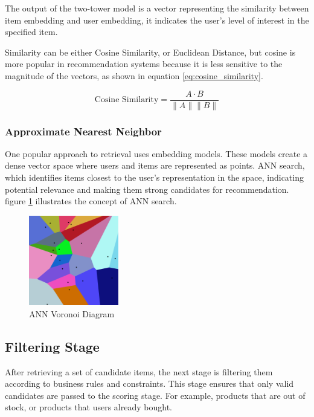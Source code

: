 The output of the two-tower model is a vector representing the similarity between item embedding and user embedding, 
it indicates the user's level of interest in the specified item.

Similarity can be either Cosine Similarity, or Euclidean Distance, but cosine is more popular in recommendation systems because it is less sensitive to the magnitude of the vectors, as shown in equation \ref{eq:cosine_similarity}.

\begin{equation}
    \text{Cosine Similarity} = \frac{A \cdot B}{\|A\| \|B\|}
    \label{eq:cosine_similarity}
\end{equation}


\subsubsection{Approximate Nearest Neighbor}

One popular approach to retrieval uses embedding models. 
These models create a dense vector space where users and items are represented as points.
ANN search,
which identifies items closest to the user's representation in the space, 
indicating potential relevance and making them strong candidates for recommendation. figure \ref{fig:AnnVoronoi} illustrates the concept of ANN search.


\begin{figure}[H]
    \centering
    \includegraphics[width=0.35\textwidth]{assets/ann.png}
    \caption[ANN Voronoi Diagram]{ANN Voronoi Diagram \cite{AnnVoronoi}}
    \label{fig:AnnVoronoi}
\end{figure}


\subsection{Filtering Stage}

After retrieving a set of candidate items, the next stage is filtering them according to business rules and constraints.
This stage ensures that only valid candidates are passed to the scoring stage.
For example, products that are out of stock, or products that users already bought.

